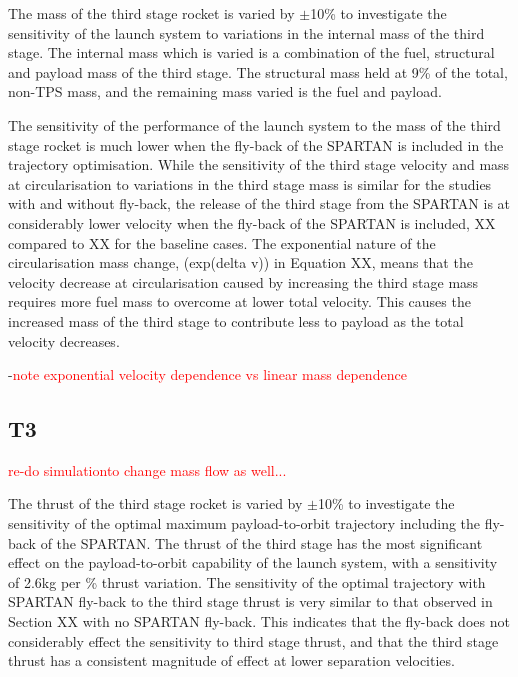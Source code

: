 The mass of the third stage rocket is varied by $\pm$10\% to investigate the sensitivity of the launch system to variations in the internal mass of the third stage. The internal mass which is varied is a combination of the fuel, structural and payload mass of the third stage. The structural mass held at 9\% of the total, non-TPS mass, and the remaining mass varied is the fuel and payload.

The sensitivity of the performance of the launch system to the mass of the third stage rocket is much lower when the fly-back of the SPARTAN is included in the trajectory optimisation. 
While the sensitivity of the third stage velocity and mass at circularisation to variations in the third stage mass is similar for the studies with and without fly-back, the release of the third stage from the SPARTAN is at considerably lower velocity when the fly-back of the SPARTAN is included, XX compared to XX for the baseline cases. 
The exponential nature of the circularisation mass change, (exp(delta v)) in Equation XX, means that the velocity decrease at circularisation caused by increasing the third stage mass requires more fuel mass to overcome at lower total velocity. This causes the increased mass of the third stage to contribute less to payload as the total velocity decreases. 


-\textcolor{red}{note exponential velocity dependence vs linear mass dependence}

\subsection{T3}

\textcolor{red}{re-do simulationto change mass flow as well...}

The thrust of the third stage rocket is varied by $\pm$10\% to investigate the sensitivity of the optimal maximum payload-to-orbit trajectory including the fly-back of the SPARTAN. 
The thrust of the third stage has the most significant effect on the payload-to-orbit capability of the launch system, with a sensitivity of 2.6kg per \% thrust variation. 
The sensitivity of the optimal trajectory with SPARTAN fly-back to the third stage thrust is very similar to that observed in Section XX with no SPARTAN fly-back. This indicates that the fly-back does not considerably effect the sensitivity to third stage thrust, and that the third stage thrust has a consistent magnitude of effect at lower separation velocities. 


